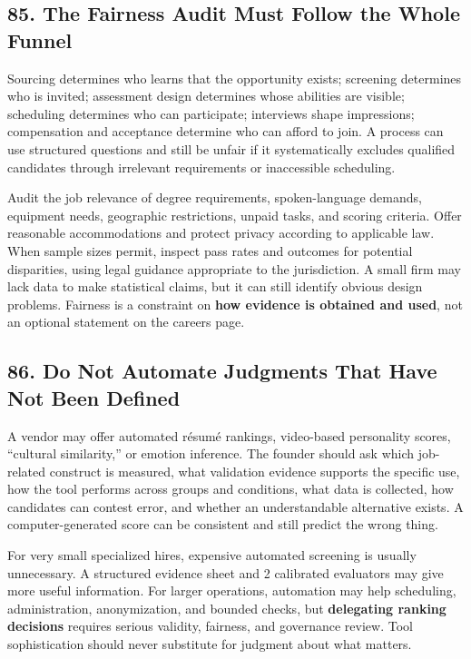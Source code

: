 \subsection*{85. The Fairness Audit Must Follow the Whole Funnel}

Sourcing determines who learns that the opportunity exists; screening determines who is invited; assessment design determines whose abilities are visible; scheduling determines who can participate; interviews shape impressions; compensation and acceptance determine who can afford to join. A process can use structured questions and still be unfair if it systematically excludes qualified candidates through irrelevant requirements or inaccessible scheduling.

Audit the job relevance of degree requirements, spoken-language demands, equipment needs, geographic restrictions, unpaid tasks, and scoring criteria. Offer reasonable accommodations and protect privacy according to applicable law. When sample sizes permit, inspect pass rates and outcomes for potential disparities, using legal guidance appropriate to the jurisdiction. A small firm may lack data to make statistical claims, but it can still identify obvious design problems. Fairness is a constraint on \textbf{how evidence is obtained and used}, not an optional statement on the careers page.

\subsection*{86. Do Not Automate Judgments That Have Not Been Defined}

A vendor may offer automated résumé rankings, video-based personality scores, ``cultural similarity,'' or emotion inference. The founder should ask which job-related construct is measured, what validation evidence supports the specific use, how the tool performs across groups and conditions, what data is collected, how candidates can contest error, and whether an understandable alternative exists. A computer-generated score can be consistent and still predict the wrong thing.

For very small specialized hires, expensive automated screening is usually unnecessary. A structured evidence sheet and 2 calibrated evaluators may give more useful information. For larger operations, automation may help scheduling, administration, anonymization, and bounded checks, but \textbf{delegating ranking decisions} requires serious validity, fairness, and governance review. Tool sophistication should never substitute for judgment about what matters.

